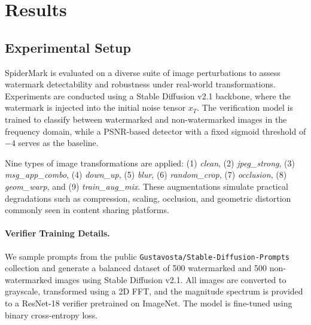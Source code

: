 \section{Results}

\subsection{Experimental Setup}
SpiderMark is evaluated on a diverse suite of image perturbations to assess watermark detectability and robustness under real-world transformations. 
Experiments are conducted using a Stable Diffusion v2.1 backbone, where the watermark is injected into the initial noise tensor \(x_T\). 
The verification model is trained to classify between watermarked and non-watermarked images in the frequency domain, while a PSNR-based detector with a fixed sigmoid threshold of \(-4\) serves as the baseline.

Nine types of image transformations are applied:  
(1) \textit{clean}, (2) \textit{jpeg\_strong}, (3) \textit{msg\_app\_combo}, (4) \textit{down\_up}, (5) \textit{blur}, (6) \textit{random\_crop}, (7) \textit{occlusion}, (8) \textit{geom\_warp}, and (9) \textit{train\_aug\_mix}.  
These augmentations simulate practical degradations such as compression, scaling, occlusion, and geometric distortion commonly seen in content sharing platforms.


\paragraph{Verifier Training Details.}
We sample prompts from the public \texttt{Gustavosta/Stable-Diffusion-Prompts} collection and generate a balanced dataset of 500 watermarked and 500 non-watermarked images using Stable Diffusion v2.1.
All images are converted to grayscale, transformed using a 2D FFT, and the magnitude spectrum is provided to a ResNet-18 verifier pretrained on ImageNet.
The model is fine-tuned using binary cross-entropy loss.



